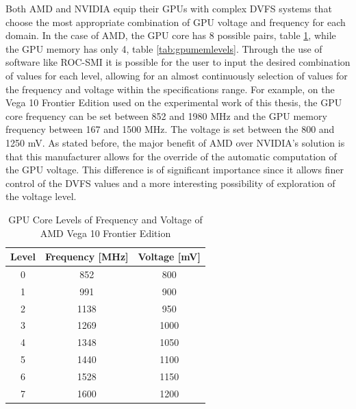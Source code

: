 Both AMD and NVIDIA equip their GPUs with complex DVFS systems that choose the most appropriate combination of GPU voltage and frequency for each domain.  In the case of AMD, the GPU core has 8 possible pairs, table \ref{tab:gpucorelevels}, while the GPU memory has only 4, table \ref{tab:gpumemlevels}. Through the use of software like ROC-SMI \cite{noauthor_radeonopencompute/roc-smi_2019} it is possible for the user to input the desired combination of values for each level, allowing for an almost continuously selection of values for the frequency and voltage within the specifications range. For example, on the Vega 10 Frontier Edition used on the experimental work of this thesis, the GPU core frequency can be set between 852 and 1980 MHz and the GPU memory frequency between 167 and 1500 MHz. The voltage is set between the 800 and 1250 mV. As stated before, the major benefit of AMD over NVIDIA's solution is that this manufacturer allows for the override of the automatic computation of the GPU voltage. This difference is of significant importance since it allows finer control of the DVFS values and a more interesting possibility of exploration of the voltage level.

\begin{table}[!htb]
\renewcommand{\arraystretch}{1.2} %
\centering
\begin{tabular}{ccc}
\textbf{Level} & \textbf{Frequency {[}MHz{]}} & \textbf{Voltage {[}mV{]}} \\ \hline
0              & 852                          & 800                       \\
1              & 991                          & 900                       \\
2              & 1138                         & 950                       \\
3              & 1269                         & 1000                      \\
4              & 1348                         & 1050                      \\
5              & 1440                         & 1100                      \\
6              & 1528                         & 1150                      \\
7              & 1600                         & 1200                      \\ \hline
\end{tabular}
\caption{GPU Core Levels of Frequency and Voltage of AMD Vega 10 Frontier Edition}
\label{tab:gpucorelevels}
\end{table}

